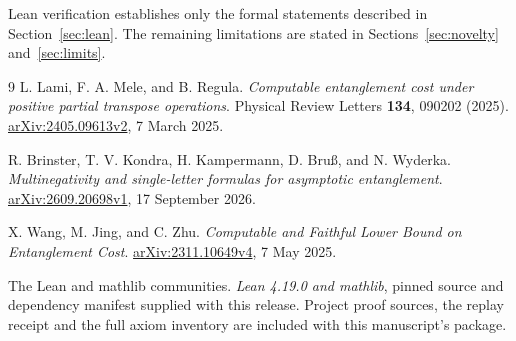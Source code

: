 \documentclass[11pt]{article}
\begin{document}
Lean verification establishes only the formal statements described in
Section~\ref{sec:lean}. The remaining limitations are stated in
Sections~\ref{sec:novelty} and~\ref{sec:limits}.

\begingroup
{}
\small
\begin{thebibliography}{9}
\setlength{\itemsep}{3pt}\setlength{\parsep}{0pt}
L. Lami, F. A. Mele, and B. Regula.
\emph{Computable entanglement cost under positive partial transpose operations}.
Physical Review Letters \textbf{134}, 090202 (2025).
\href{https://arxiv.org/abs/2405.09613v2}{arXiv:2405.09613v2}, 7 March 2025.

R. Brinster, T. V. Kondra, H. Kampermann, D. Bru\ss, and N. Wyderka.
\emph{Multinegativity and single-letter formulas for asymptotic entanglement}.
\href{https://arxiv.org/abs/2609.20698v1}{arXiv:2609.20698v1}, 17 September 2026.

X. Wang, M. Jing, and C. Zhu.
\emph{Computable and Faithful Lower Bound on Entanglement Cost}.
\href{https://arxiv.org/abs/2311.10649v4}{arXiv:2311.10649v4}, 7 May 2025.

The Lean and mathlib communities.
\emph{Lean 4.19.0 and mathlib}, pinned source and dependency manifest supplied
with this release. Project proof sources, the replay receipt and the full
axiom inventory are included with this manuscript's package.
\end{thebibliography}
\endgroup
\end{document}
